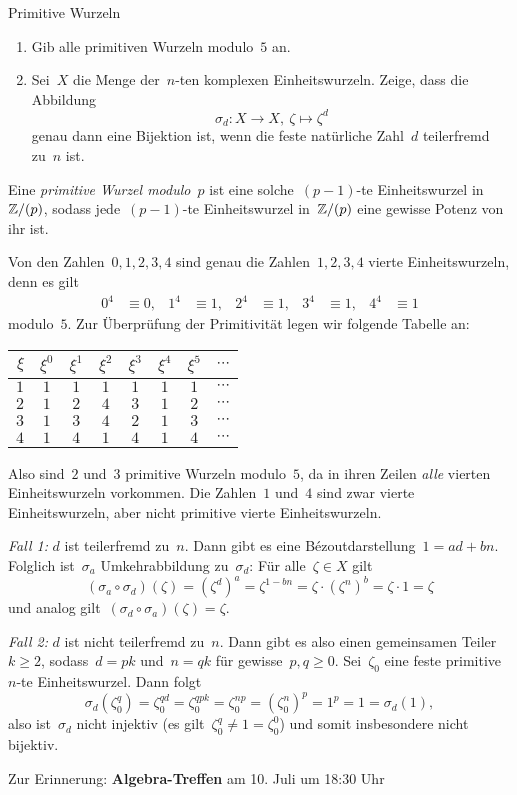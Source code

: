 \documentclass{algblatt}
\begin{document}
\ifloesungen\newpage\fi
\begin{aufgabe}{Primitive Wurzeln}
\begin{enumerate}
\item Gib alle primitiven Wurzeln modulo~$5$ an.

\item Sei~$X$ die Menge der~$n$-ten komplexen Einheitswurzeln. Zeige, dass die
Abbildung
\[ \sigma_d : X \longrightarrow X,\ \zeta \longmapsto \zeta^d \]
genau dann eine Bijektion ist, wenn die feste natürliche Zahl~$d$ teilerfremd
zu~$n$ ist.
\end{enumerate}

\begin{loesungE}
\item Eine \emph{primitive Wurzel modulo~$p$} ist eine solche~$(p-1)$-te
Einheitswurzel in~$\mathbb{Z}/(p)$, sodass jede~$(p-1)$-te Einheitswurzel in~$\mathbb{Z}/(p)$
eine gewisse Potenz von ihr ist.

Von den Zahlen~$0,1,2,3,4$ sind genau die Zahlen~$1,2,3,4$ vierte
Einheitswurzeln, denn es gilt
\begin{align*}
  0^4 &\equiv 0, & 1^4 &\equiv 1, & 2^4 &\equiv 1, & 3^4 &\equiv 1, &
  4^4 &\equiv 1
\end{align*}
modulo~$5$. Zur Überprüfung der Primitivität legen wir folgende Tabelle an:
\begin{center}
  \begin{tabular}{r|c|c|c|c|c|c|c}
    $\xi$ & $\xi^0$ & $\xi^1$ & $\xi^2$ & $\xi^3$ & $\xi^4$ & $\xi^5$ & $\cdots$ \\\hline
    $1$ & $1$ & $1$ & $1$ & $1$ & $1$ & $1$ & $\cdots$ \\
    $2$ & $1$ & $2$ & $4$ & $3$ & $1$ & $2$ & $\cdots$ \\
    $3$ & $1$ & $3$ & $4$ & $2$ & $1$ & $3$ & $\cdots$ \\
    $4$ & $1$ & $4$ & $1$ & $4$ & $1$ & $4$ & $\cdots$
  \end{tabular}
\end{center}
Also sind~$2$ und~$3$ primitive Wurzeln modulo~$5$, da in ihren Zeilen
\emph{alle} vierten Einheitswurzeln vorkommen. Die Zahlen~$1$ und~$4$ sind zwar
vierte Einheitswurzeln, aber nicht primitive vierte Einheitswurzeln.

\item \emph{Fall 1:} $d$ ist teilerfremd zu~$n$. Dann gibt es eine
Bézoutdarstellung~$1 = ad + bn$. Folglich ist~$\sigma_a$ Umkehrabbildung
zu~$\sigma_d$: Für alle~$\zeta \in X$ gilt
\[ (\sigma_a \circ \sigma_d)(\zeta) =
  (\zeta^d)^a = \zeta^{1 - bn} = \zeta \cdot (\zeta^n)^b = \zeta \cdot 1 =
  \zeta \]
und analog gilt~$(\sigma_d \circ \sigma_a)(\zeta) = \zeta$.

\emph{Fall 2:} $d$ ist nicht teilerfremd zu~$n$. Dann gibt es also einen
gemeinsamen Teiler~$k \geq 2$, sodass~$d = pk$ und~$n = qk$ für gewisse~$p,q
\geq 0$. Sei~$\zeta_0$ eine feste primitive~$n$-te Einheitswurzel. Dann folgt
\[ \sigma_d(\zeta_0^q) = \zeta_0^{qd} = \zeta_0^{qpk} = \zeta_0^{np} =
(\zeta_0^n)^p = 1^p = 1 = \sigma_d(1), \]
also ist~$\sigma_d$ nicht injektiv (es gilt~$\zeta_0^q \neq 1 = \zeta_0^0$) und
somit insbesondere nicht bijektiv.
\end{loesungE}
\end{aufgabe}

Zur Erinnerung: \textbf{Algebra-Treffen} am 10. Juli um 18:30 Uhr
\end{document}
